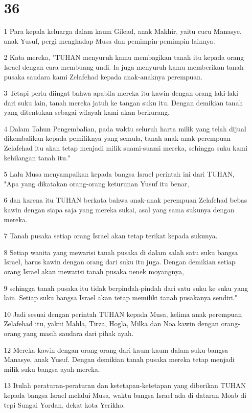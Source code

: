 \chapter{36}

\par 1 Para kepala keluarga dalam kaum Gilead, anak Makhir, yaitu cucu Manasye, anak Yusuf, pergi menghadap Musa dan pemimpin-pemimpin lainnya.
\par 2 Kata mereka, "TUHAN menyuruh kamu membagikan tanah itu kepada orang Israel dengan cara membuang undi. Ia juga menyuruh kamu memberikan tanah pusaka saudara kami Zelafehad kepada anak-anaknya perempuan.
\par 3 Tetapi perlu diingat bahwa apabila mereka itu kawin dengan orang laki-laki dari suku lain, tanah mereka jatuh ke tangan suku itu. Dengan demikian tanah yang ditentukan sebagai wilayah kami akan berkurang.
\par 4 Dalam Tahun Pengembalian, pada waktu seluruh harta milik yang telah dijual dikembalikan kepada pemiliknya yang semula, tanah anak-anak perempuan Zelafehad itu akan tetap menjadi milik suami-suami mereka, sehingga suku kami kehilangan tanah itu."
\par 5 Lalu Musa menyampaikan kepada bangsa Israel perintah ini dari TUHAN, "Apa yang dikatakan orang-orang keturunan Yusuf itu benar,
\par 6 dan karena itu TUHAN berkata bahwa anak-anak perempuan Zelafehad bebas kawin dengan siapa saja yang mereka sukai, asal yang sama sukunya dengan mereka.
\par 7 Tanah pusaka setiap orang Israel akan tetap terikat kepada sukunya.
\par 8 Setiap wanita yang mewarisi tanah pusaka di dalam salah satu suku bangsa Israel, harus kawin dengan orang dari suku itu juga. Dengan demikian setiap orang Israel akan mewarisi tanah pusaka nenek moyangnya,
\par 9 sehingga tanah pusaka itu tidak berpindah-pindah dari satu suku ke suku yang lain. Setiap suku bangsa Israel akan tetap memiliki tanah pusakanya sendiri."
\par 10 Jadi sesuai dengan perintah TUHAN kepada Musa, kelima anak perempuan Zelafehad itu, yakni Mahla, Tirza, Hogla, Milka dan Noa kawin dengan orang-orang yang masih saudara dari pihak ayah.
\par 12 Mereka kawin dengan orang-orang dari kaum-kaum dalam suku bangsa Manasye, anak Yusuf. Dengan demikian tanah pusaka mereka tetap menjadi milik suku bangsa ayah mereka.
\par 13 Itulah peraturan-peraturan dan ketetapan-ketetapan yang diberikan TUHAN kepada bangsa Israel melalui Musa, waktu bangsa Israel ada di dataran Moab di tepi Sungai Yordan, dekat kota Yerikho.


